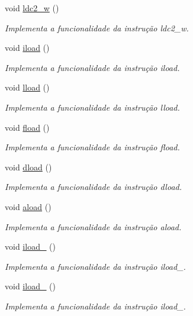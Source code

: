 \begin{DoxyCompactItemize}
void \hyperlink{classOperations_ae5f11d6a8ea22b30f316c47af914f05a}{ldc2\+\_\+w} ()
\begin{DoxyCompactList}\small\item\em Implementa a funcionalidade da instrução ldc2\+\_\+w. \end{DoxyCompactList}\item 
void \hyperlink{classOperations_a84e70afc25fa4e54a7e2bffae742222a}{iload} ()
\begin{DoxyCompactList}\small\item\em Implementa a funcionalidade da instrução iload. \end{DoxyCompactList}\item 
void \hyperlink{classOperations_abd9d44b782cc5ae7d7985a424a0985c6}{lload} ()
\begin{DoxyCompactList}\small\item\em Implementa a funcionalidade da instrução lload. \end{DoxyCompactList}\item 
void \hyperlink{classOperations_af6204248b38b7e6af3a4a6d0f805d79f}{fload} ()
\begin{DoxyCompactList}\small\item\em Implementa a funcionalidade da instrução fload. \end{DoxyCompactList}\item 
void \hyperlink{classOperations_af53b0b32da7737741c20b4e313eaac84}{dload} ()
\begin{DoxyCompactList}\small\item\em Implementa a funcionalidade da instrução dload. \end{DoxyCompactList}\item 
void \hyperlink{classOperations_a2f5c13146658e71de665c3b32ebed8c9}{aload} ()
\begin{DoxyCompactList}\small\item\em Implementa a funcionalidade da instrução aload. \end{DoxyCompactList}\item 
void \hyperlink{classOperations_a3aba059cf78681767c141d27989fc2aa}{iload\+\_} ()
\begin{DoxyCompactList}\small\item\em Implementa a funcionalidade da instrução iload\+\_. \end{DoxyCompactList}\item 
void \hyperlink{classOperations_a4b9d8ef21894c0db2203c06712e97765}{iload\+\_} ()
\begin{DoxyCompactList}\small\item\em Implementa a funcionalidade da instrução iload\+\_. \end{DoxyCompactList}\item 

\end{DoxyCompactItemize}

